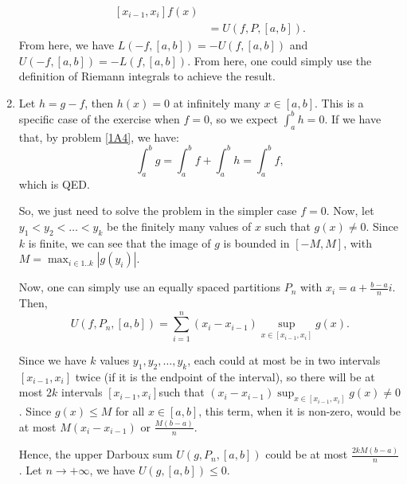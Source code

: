 \begin{enumerate}[label=\textbf{1A.\arabic*}]
\begin{align*}
{                       [x_{i-1}, x_{i}]} f(x) \\
                       &= U(f, P, [a, b])
    .\end{align*}
    From here, we have \( L(-f, [a, b]) = -U(f, [a, b]) \) and \( U(-f, [a, b])
    = -L(f, [a, b])\). From here, one could simply use the definition of Riemann
    integrals to achieve the result.
  \item Let \( h = g - f \), then \( h(x) = 0 \) at infinitely many \( x \in
    [a, b]\). This is a specific case of the exercise when \( f = 0 \), so we
    expect \( \int_{a}^{b} h = 0 \). If we have that, by problem \ref{1A4}, we
    have:
    \[
      \int _{a}^{b} g = \int _{a}^{b} f + \int _{a}^{b} h = \int _{a}^{b} f
    ,\] which is QED.

    So, we just need to solve the problem in the simpler case \( f = 0 \). Now,
    let \( y_{1} < y_{2} < \ldots < y_{k} \) be the finitely many values of \( x
    \) such that \( g(x) \neq 0 \). Since \( k \) is finite, we can see that the
    image of \( g \) is bounded in \( [-M, M] \), with \( M = \max_{i \in 1..k}
    |g(y_{i})|\).

    Now, one can simply use an equally spaced partitions \( P_{n} \) with \(
    x_{i} = a + \frac{b - a}{n} i \). Then,
    \[
      U(f, P_{n}, [a, b]) = \sum_{i = 1}^{n} (x_{i} - x_{i-1})\sup_{x \in [x_{i
      - 1}, x_{i}]} g(x)
    .\] 
    
    Since we have \( k \) values \( y_{1}, y_{2}, \ldots ,y_{k} \), each could
    at most be in two intervals \( [x_{i-1}, x_{i}] \) twice (if it is the
    endpoint of the interval), so there will be at most \( 2k \) intervals \(
    [x_{i-1}, x_{i}] \)such that \( (x_{i} - x_{i - 1})\sup_{x \in [x_{i-1},
    x_{i}]} g(x) \neq  0\). Since \( g(x) \le M \) for all \( x \in [a, b] \),
    this term, when it is non-zero, would be at most \( M(x_{i} - x_{i-1}) \) or
    \( \frac{M(b-a)}{n} \).

    Hence, the upper Darboux sum \( U(g, P_{n}, [a, b]) \) could be at most \(
    \frac{2kM(b-a)}{n} \). Let \( n \to +\infty \), we have \( U(g, [a,
    b]) \le 0 \).


\end{enumerate}
